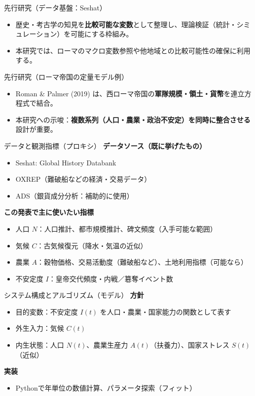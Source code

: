 \documentclass[aspectratio=169,11pt]{beamer}
\begin{document}
\begin{frame}{先行研究（データ基盤：Seshat）}
  \begin{itemize}
    \item 歴史・考古学の知見を\textbf{比較可能な変数}として整理し、理論検証（統計・シミュレーション）を可能にする枠組み。
    \item 本研究では、ローマのマクロ変数参照や他地域との比較可能性の確保に利用する。
  \end{itemize}
\end{frame}

\begin{frame}{先行研究（ローマ帝国の定量モデル例）}
  \begin{itemize}
    \item Roman \& Palmer (2019) は、西ローマ帝国の\textbf{軍隊規模・領土・貨幣}を連立方程式で結合。
    \item 本研究への示唆：\textbf{複数系列（人口・農業・政治不安定）を同時に整合させる}設計が重要。
  \end{itemize}
\end{frame}

\begin{frame}{データと観測指標（プロキシ）}
  \textbf{データソース（既に挙げたもの）}
  \begin{itemize}
    \item Seshat: Global History Databank
    \item OXREP（難破船などの経済・交易データ）
    \item ADS（銀貨成分分析：補助的に使用）
  \end{itemize}

  \vspace{0.6em}
  \textbf{この発表で主に使いたい指標}
  \begin{itemize}
    \item 人口 $N$：人口推計、都市規模推計、碑文頻度（入手可能な範囲）
    \item 気候 $C$：古気候復元（降水・気温の近似）
    \item 農業 $A$：穀物価格、交易活動度（難破船など）、土地利用指標（可能なら）
    \item 不安定度 $I$：皇帝交代頻度・内戦／簒奪イベント数
  \end{itemize}
\end{frame}

\begin{frame}{システム構成とアルゴリズム（モデル）}
  \textbf{方針}
  \begin{itemize}
    \item 目的変数：不安定度 $I(t)$ を人口・農業・国家能力の関数として表す
    \item 外生入力：気候 $C(t)$
    \item 内生状態：人口 $N(t)$、農業生産力 $A(t)$（扶養力）、国家ストレス $S(t)$（近似）
  \end{itemize}

  \vspace{0.6em}
  \textbf{実装}
  \begin{itemize}
    \item Pythonで年単位の数値計算、パラメータ探索（フィット）
  \end{itemize}
\end{frame}
\end{document}
